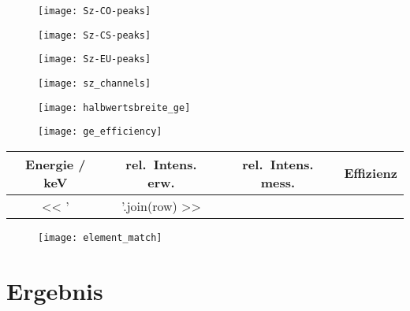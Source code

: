 \documentclass[11pt, ngerman, fleqn, DIV=15, headinclude, BCOR=2cm]{scrreprt}
\newcommand{\plotwidth}{0.8\linewidth}
\begin{document}
\begin{figure}
    \centering
    \texttt{[image: Sz-CO-peaks]}
    \caption{%
    }
    \label{fig:}
\end{figure}

\begin{figure}
    \centering
    \texttt{[image: Sz-CS-peaks]}
    \caption{%
    }
    \label{fig:}
\end{figure}

\begin{figure}
    \centering
    \texttt{[image: Sz-EU-peaks]}
    \caption{%
    }
    \label{fig:}
\end{figure}

\begin{figure}
    \centering
    \texttt{[image: sz\_channels]}
    \caption{%
    }
    \label{fig:sz_kanal}
\end{figure}


\begin{figure}
    \centering
    \texttt{[image: halbwertsbreite\_ge]}
    \caption{%
    }
    \label{fig:halbwertsbreite}
\end{figure}


\begin{figure}
    \centering
    \texttt{[image: ge\_efficiency]}
    \caption{%
    }
    \label{fig:effizienz}
\end{figure}

\begin{tabular}{SSSS}
    {Energie / \si{\kilo\electronvolt}} & {rel.\ Intens. erw.} & {rel.\ Intens.
mess.} & {Effizienz} \\
    \midrule
    << ' & '.join(row) >> \\
\end{tabular}



\begin{figure}
    \centering
    \texttt{[image: element\_match]}
    \caption{%
    }
    \label{fig:element_match}
\end{figure}


\chapter{Ergebnis}




\begin{appendix}


\end{appendix}
\end{document}
